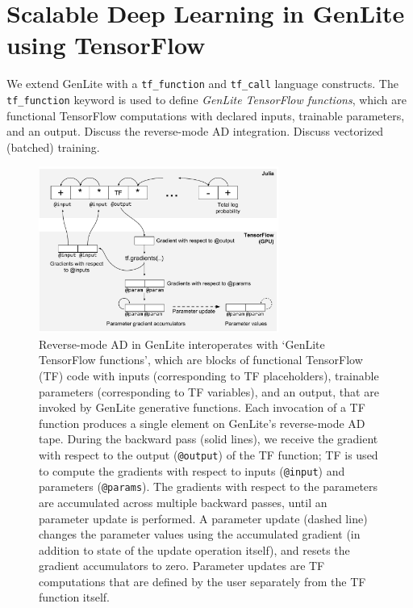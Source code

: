 \documentclass{article}
\begin{document}
\section{Scalable Deep Learning in GenLite using TensorFlow}
We extend GenLite with a \texttt{tf\_function} and \texttt{tf\_call} language constructs.
The \texttt{tf\_function} keyword is used to define \emph{GenLite TensorFlow functions}, which are functional TensorFlow computations with declared inputs, trainable parameters, and an output.
Discuss the reverse-mode AD integration.
Discuss vectorized (batched) training.

\begin{figure}[h]
\centering
    \includegraphics[width=0.7\textwidth]{images/tf-integration-schematic.pdf}
    \caption{
Reverse-mode AD in GenLite interoperates with `GenLite TensorFlow functions', which are blocks of functional TensorFlow (TF) code with inputs (corresponding to TF placeholders), trainable parameters (corresponding to TF variables), and an output, that are invoked by GenLite generative functions.
Each invocation of a TF function produces a single element on GenLite's reverse-mode AD tape.
During the backward pass (solid lines), we receive the gradient with respect to the output (\texttt{@output}) of the TF function; TF is used to compute the gradients with respect to inputs (\texttt{@input}) and parameters (\texttt{@params}).
The gradients with respect to the parameters are accumulated across multiple backward passes, until an parameter update is performed.
A parameter update (dashed line) changes the parameter values using the accumulated gradient (in addition to state of the update operation itself), and resets the gradient accumulators to zero.
Parameter updates are TF computations that are defined by the user separately from the TF function itself.
}
    \label{fig:tf-integration-schematic}
\end{figure}
\end{document}
